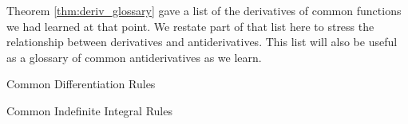 Theorem \ref{thm:deriv_glossary} gave a list of the derivatives of common functions we had learned at that point. We restate part of that list here to stress the relationship between derivatives and antiderivatives. This list will also be useful as a glossary of common antiderivatives as we learn.

\newlength{\bh}%
\newlength{\bd}%


{\begin{minipage}[t]{.45\specialboxlength}
Common Differentiation Rules\rule[-2pt]{0pt}{1pt}
\end{minipage}
\begin{minipage}[t]{.55\specialboxlength}
Common Indefinite Integral Rules\rule[-2pt]{0pt}{1pt}
\begin{enumerate}

\end{enumerate}
\end{minipage}}
